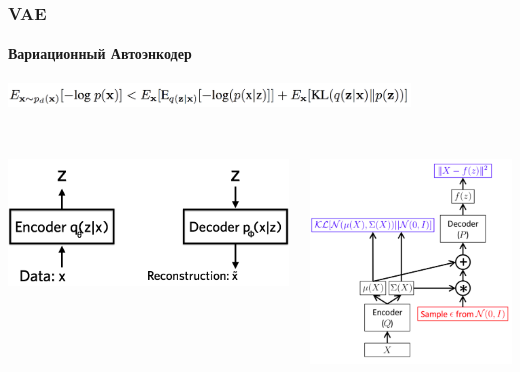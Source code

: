 \documentclass[10pt]{beamer}
\begin{document}
\begin{frame}
\frametitle{VAE}
\framesubtitle{Вариационный Автоэнкодер}

\begin{center}
    \includegraphics[width=0.8\textwidth]{images/elbo.png} \\
    \vskip-5mm \\
    \begin{columns}
        \begin{column}{0.5\textwidth}
            \begin{center}
                \includegraphics[width=\textwidth]{images/vae_parts.png}
            \end{center}
        \end{column}
        \begin{column}{0.5\textwidth}
            \begin{center}
                \includegraphics[width=\textwidth]{images/vae_terms.png}
            \end{center}
        \end{column}
    \end{columns}
\end{center}

\end{frame}
\end{document}

